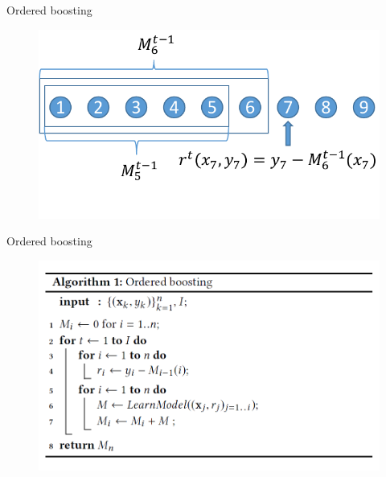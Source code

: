 \documentclass[pdf, 12pt, unicode]{beamer}
\newcommand{\1}{\mathbbm{1}}
\begin{document}
\begin{frame}{Ordered boosting}

\begin{figure}
	\centering
	\includegraphics[width=\textwidth]{comics.pdf}
\end{figure}

\end{frame}


\begin{frame}{Ordered boosting}


\begin{figure}
	\centering
	\includegraphics[width=\textwidth]{algorithm.png}
\end{figure}

\end{frame}

	
\end{document}
